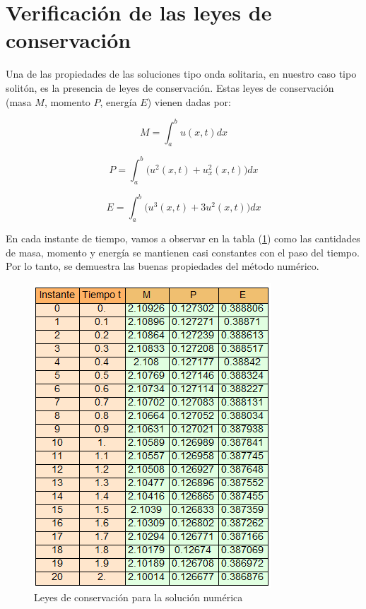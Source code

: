  
\section{Verificación de las leyes de conservación}

Una de las propiedades de las soluciones tipo onda solitaria, en nuestro caso tipo solitón, es la presencia de leyes de conservación. Estas leyes de conservación (masa $M$, momento $P$, energía $E$) vienen dadas por:

\begin{equation}
\label{Masa}
    M=\int_{a}^{b}u(x,t)dx
\end{equation}

\begin{equation}
\label{Momento}
    P=\int_{a}^{b}\bigg(u^{2}(x,t)+u_{x}^{2}(x,t)\bigg)dx
\end{equation}

\begin{equation}
\label{Energia}
    E=\int_{a}^{b}\bigg(u^{3}(x,t)+3u^{2}(x,t)\bigg)dx
\end{equation}

En cada instante de tiempo, vamos a observar en la tabla (\ref{fig:LeyesConservativas}) como las cantidades de masa, momento y energía se mantienen casi constantes con el paso del tiempo. Por lo tanto, se demuestra las buenas propiedades del método numérico.
\begin{figure}[h]
  \centering
    \includegraphics{Leyes conservativas nuevas.png}
  \caption{Leyes de conservación para la solución numérica}
  \label{fig:LeyesConservativas}
\end{figure}
\newpage


